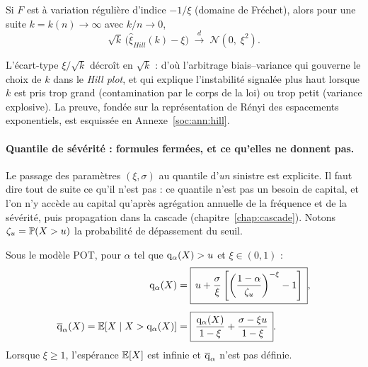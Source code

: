\begin{proposition}\label{soc:prop:hill}
Si $F$ est à variation régulière d'indice $-1/\xi$ (domaine de Fréchet), alors pour une suite $k=k(n)\to\infty$ avec $k/n\to0$,
\begin{equation}
\sqrt{k}\,\bigl(\hat\xi_{Hill}(k)-\xi\bigr)\;\xrightarrow{\;d\;}\;\mathcal{N}(0,\;\xi^2).
\end{equation}
\end{proposition}

\noindent L'écart-type $\xi/\sqrt{k}$ décroît en $\sqrt{k}$ : d'où l'arbitrage biais--variance qui gouverne le choix de $k$ dans le \emph{Hill plot}, et qui explique l'instabilité signalée plus haut lorsque $k$ est pris trop grand (contamination par le corps de la loi) ou trop petit (variance explosive). La preuve, fondée sur la représentation de Rényi des espacements exponentiels, est esquissée en Annexe~\ref{soc:ann:hill}.

\paragraph{Quantile de sévérité : formules fermées, et ce qu'elles ne donnent pas.} Le passage des paramètres $(\xi,\sigma)$ au quantile d'\emph{un} sinistre est explicite. Il faut dire tout de suite ce qu'il n'est pas : ce quantile n'est pas un besoin de capital, et l'on n'y accède au capital qu'après agrégation annuelle de la fréquence et de la sévérité, puis propagation dans la cascade (chapitre~\ref{chap:cascade}). Notons $\zeta_u=\mathbb{P}(X>u)$ la probabilité de dépassement du seuil.

\begin{proposition}\label{soc:prop:varestvar}
Sous le modèle POT, pour $\alpha$ tel que $\mathrm{q}_\alpha(X)>u$ et $\xi\in(0,1)$ :
\begin{align}
\mathrm{q}_\alpha(X) &= \boxed{\,u + \frac{\sigma}{\xi}\left[\left(\frac{1-\alpha}{\zeta_u}\right)^{-\xi}-1\right]\,},\label{soc:eq:var-gpd}\\[4pt]
\overline{\mathrm{q}}_\alpha(X) = \mathbb{E}[X\mid X>\mathrm{q}_\alpha(X)] &= \boxed{\,\frac{\mathrm{q}_\alpha(X)}{1-\xi}+\frac{\sigma-\xi u}{1-\xi}\,}.\label{soc:eq:tvar-gpd}
\end{align}
Lorsque $\xi\ge 1$, l'espérance $\mathbb{E}[X]$ est infinie et $\overline{\mathrm{q}}_\alpha$ n'est pas définie.
\end{proposition}

